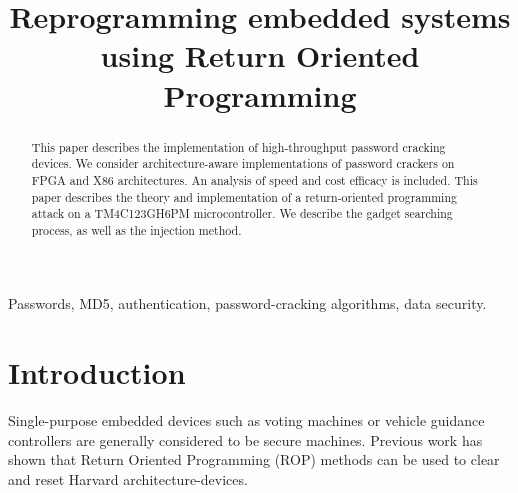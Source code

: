 


\title{Reprogramming embedded systems using Return Oriented Programming}

\author{
}

\maketitle


\begin{abstract}
This paper describes the implementation of high-throughput password cracking devices. We consider architecture-aware implementations of password crackers on FPGA and X86 architectures. An analysis of speed and cost efficacy is included. 
This paper describes the theory and implementation of a return-oriented programming attack on a TM4C123GH6PM microcontroller. We describe the gadget searching process, as well as the injection method. 


\end{abstract}

\begin{IEEEkeywords}
Passwords, MD5, authentication, password-cracking algorithms, data security.
\end{IEEEkeywords}

\section{Introduction}
	Single-purpose embedded devices such as voting machines or vehicle guidance controllers are generally considered to be secure machines. Previous work has shown that Return Oriented Programming (ROP) methods can be used to clear and reset Harvard architecture-devices. %

